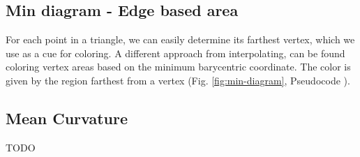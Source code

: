 \subsection{Min diagram - Edge based area} \label{section:max-diagram}
For each point in a triangle, we can easily determine its farthest vertex, which we use as a cue for coloring.
A different approach from interpolating, can be found coloring vertex areas based on the minimum barycentric coordinate.
The color is given by the region farthest from a vertex (Fig. \ref{fig:min-diagram}, Pseudocode \color{red}{insert Pseudocode}\color{black}).

\subsection{Mean Curvature}
TODO